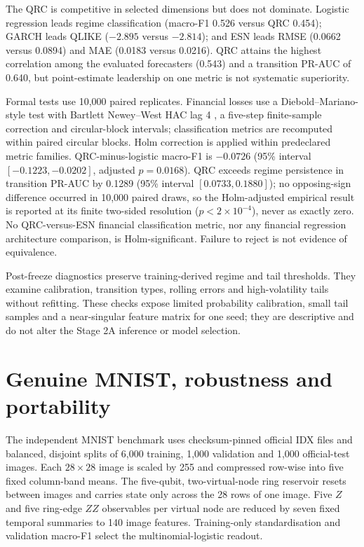 \documentclass[11pt,a4paper]{article}
\begin{document}
The QRC is competitive in selected dimensions but does not dominate.
Logistic regression leads regime classification (macro-F1 0.526 versus QRC
0.454); GARCH leads QLIKE (\(-2.895\) versus \(-2.814\)); and ESN leads RMSE
(0.0662 versus 0.0894) and MAE (0.0183 versus 0.0216). QRC attains the highest
correlation among the evaluated forecasters (0.543) and a transition PR-AUC of
0.640, but point-estimate leadership on one metric is not systematic
superiority.

Formal tests use 10,000 paired replicates. Financial losses use a
Diebold--Mariano-style test \cite{diebold1995comparing} with Bartlett
Newey--West HAC lag 4 \cite{newey1987simple}, a five-step finite-sample
correction and circular-block intervals; classification metrics are recomputed
within paired circular blocks. Holm correction is applied within predeclared
metric families. QRC-minus-logistic macro-F1 is \(-0.0726\)
(95\% interval \([-0.1223,-0.0202]\), adjusted \(p=0.0168\)).
QRC exceeds regime persistence in transition PR-AUC by 0.1289
(95\% interval \([0.0733,0.1880]\)); no opposing-sign difference occurred in
10,000 paired draws, so the Holm-adjusted empirical result is reported at its
finite two-sided resolution (\(p<2\times10^{-4}\)), never as exactly zero.
No QRC-versus-ESN financial classification metric, nor any financial
regression architecture comparison, is Holm-significant. Failure to reject is
not evidence of equivalence.

Post-freeze diagnostics preserve training-derived regime and tail thresholds.
They examine calibration, transition types, rolling errors and high-volatility
tails without refitting. These checks expose limited probability calibration,
small tail samples and a near-singular feature matrix for one seed; they are
descriptive and do not alter the Stage 2A inference or model selection.

\section{Genuine MNIST, robustness and portability}

The independent MNIST benchmark uses checksum-pinned official IDX files
\cite{lecun1998gradient} and balanced, disjoint splits of 6,000 training,
1,000 validation and 1,000 official-test images. Each \(28\times28\) image is
scaled by 255 and compressed row-wise into five fixed column-band means. The
five-qubit, two-virtual-node ring reservoir resets between images and carries
state only across the 28 rows of one image. Five \(Z\) and five ring-edge
\(ZZ\) observables per virtual node are reduced by seven fixed temporal summaries to
140 image features. Training-only standardisation and validation macro-F1
select the multinomial-logistic readout.
\end{document}

